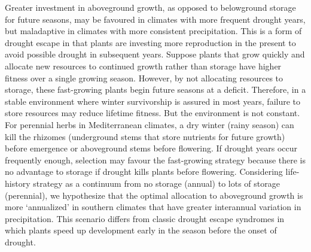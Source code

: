 \documentclass[11pt, oneside]{article}
\begin{document}
Greater investment in aboveground growth, as opposed to belowground storage for future seasons, may be favoured in climates with more frequent drought years, but maladaptive in climates with more consistent precipitation. This is a form of drought escape in that plants are investing more reproduction in the present to avoid possible drought in subsequent years. Suppose plants that grow quickly and allocate new resources to continued growth rather than storage have higher fitness over a single growing season. However, by not allocating resources to storage, these fast-growing plants begin future seasons at a deficit. Therefore, in a stable environment where winter survivorship is assured in most years, failure to store resources may reduce lifetime fitness. But the environment is not constant. For perennial herbs in Mediterranean climates, a dry winter (rainy season) can kill the rhizomes (underground stems that store nutrients for future growth) before emergence or aboveground stems before flowering. If drought years occur frequently enough, selection may favour the fast-growing strategy because there is no advantage to storage if drought kills plants before flowering. Considering life-history strategy as a continuum from no storage (annual) to lots of storage (perennial), we hypothesize that the optimal allocation to aboveground growth is more `annualized' in southern climates that have greater interannual variation in precipitation. This scenario differs from classic drought escape syndromes in which plants speed up development early in the season before the onset of drought.
\end{document}
